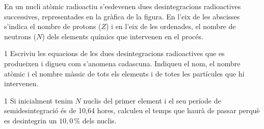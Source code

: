 En un nucli atòmic radioactiu s'esdevenen dues desintegracions radioactives successives, representades en la gràfica de la figura. En l'eix de les abscisses s'indica el nombre de protons ($Z$) i en l'eix de les ordenades, el nombre de neutrons ($N$) dels elements químics que intervenen en el procés.


\begin{apartat}{1}
Escriviu les equacions de les dues desintegracions radioactives que es produeixen i digueu com s'anomena cadascuna. Indiqueu el nom, el nombre atòmic i el nombre màssic de tots els elements i de totes les partícules que hi intervenen.
\end{apartat}

\begin{apartat}{1}
Si inicialment tenim $N$ nuclis del primer element i el seu període de semidesintegració és de 10,64 hores, calculeu el temps que haurà de passar perquè es desintegrin un $10,0\,\%$ dels nuclis.
\end{apartat}

